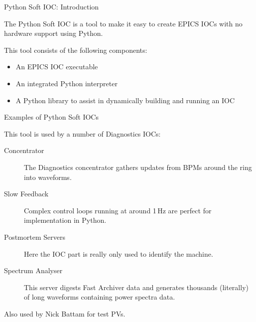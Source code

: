 \documentclass{beamer}
\begin{document}
%
\begin{frame}
\titlepage
\end{frame}



%
\begin{frame}{Python Soft IOC: Introduction}

The Python Soft IOC is a tool to make it easy to create EPICS IOCs with no
hardware support using Python.

\medskip

This tool consists of the following components:

\begin{itemize}
\item An EPICS IOC executable
\item An integrated Python interpreter
\item A Python library to assist in dynamically building and running an IOC
\end{itemize}

\end{frame}


%
\begin{frame}{Examples of Python Soft IOCs}

This tool is used by a number of Diagnostics IOCs:

\begin{description}
\item[Concentrator]
The Diagnostics concentrator gathers updates from BPMs around the ring into
waveforms.
\item[Slow Feedback]
Complex control loops running at around 1\,Hz are perfect for implementation in
Python.
\item[Postmortem Servers]
Here the IOC part is really only used to identify the machine.
\item[Spectrum Analyser]
This server digests Fast Archiver data and generates thousands (literally) of
long waveforms containing power spectra data.
\end{description}

Also used by Nick Battam for test PVs.

\end{frame}
\end{document}

